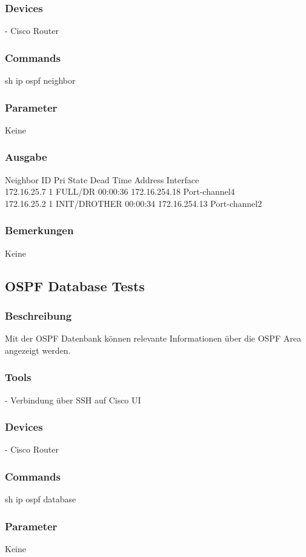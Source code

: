 \documentclass[a4,12pt]{scrartcl}
\begin{document}
\subsubsection{Devices}
- Cisco Router
\subsubsection{Commands}
sh ip ospf neighbor
\subsubsection{Parameter}
Keine
\subsubsection{Ausgabe}
Neighbor ID     Pri   State           Dead Time   Address         Interface\\
172.16.25.7       1   FULL/DR         00:00:36    172.16.254.18   Port-channel4\\
172.16.25.2       1   INIT/DROTHER    00:00:34    172.16.254.13   Port-channel2
\subsubsection{Bemerkungen}
Keine

\subsection{OSPF Database Tests}
\subsubsection{Beschreibung}
Mit der OSPF Datenbank können relevante Informationen über die OSPF Area angezeigt werden.
\subsubsection{Tools}
- Verbindung über SSH auf Cisco UI
\subsubsection{Devices}
- Cisco Router
\subsubsection{Commands}
sh ip ospf database
\subsubsection{Parameter}
Keine
\end{document}

